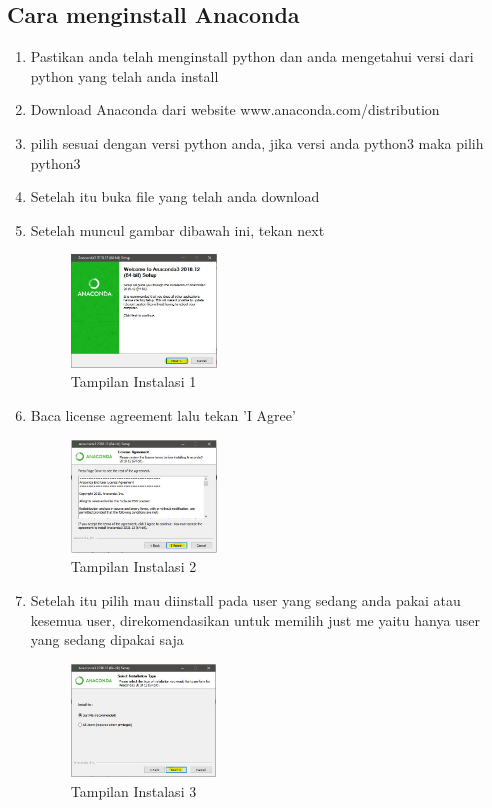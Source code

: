 \subsection{Cara menginstall Anaconda}
\begin{enumerate}
  \item Pastikan anda telah menginstall python dan anda mengetahui versi dari python yang telah anda install
  \item Download Anaconda dari website www.anaconda.com/distribution
  \item pilih sesuai dengan versi python anda, jika versi anda python3 maka pilih python3
  \item Setelah itu buka file yang telah anda download
  \item Setelah muncul gambar dibawah ini, tekan next
\begin{figure}[!htbp]
  \centering
  \includegraphics[height=3cm]{chapters/gambar/install1.jpg}
  \caption{Tampilan Instalasi 1}
\end{figure}

  \item Baca license agreement lalu tekan 'I Agree'
\begin{figure}[!htbp]
  \centering
  \includegraphics[height=3cm]{chapters/gambar/install2.jpg}
  \caption{Tampilan Instalasi 2}
\end{figure}

  \item Setelah itu pilih mau diinstall pada user yang sedang anda pakai atau kesemua user, direkomendasikan untuk memilih just me yaitu hanya user yang sedang dipakai saja
\begin{figure}[!htbp]
  \centering
  \includegraphics[height=3cm]{chapters/gambar/install3.jpg}
  \caption{Tampilan Instalasi 3}
\end{figure}


\end{enumerate}
